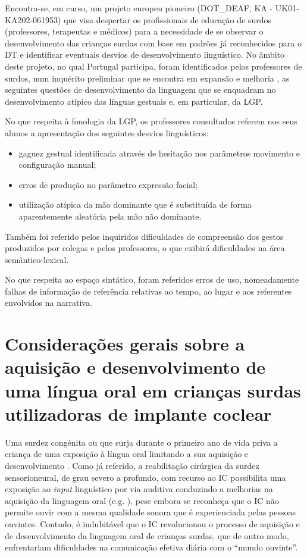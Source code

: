 \documentclass[output=paper,colorlinks,citecolor=brown,booklanguage=portuguese]{langscibook}
\begin{document}
Encontra-se, em curso, um projeto europeu pioneiro (DOT\_DEAF, KA - UK01-KA202-061953) que visa despertar os profissionais de educação de surdos (professores, terapeutas e médicos) para a necessidade de se observar o desenvolvimento das crianças surdas com base em padrões já reconhecidos para o DT e identificar eventuais desvios de desenvolvimento linguístico. No âmbito deste projeto, no qual Portugal participa, foram identificados pelos professores de surdos, num inquérito preliminar que se encontra em expansão e melhoria \citep{Mineiroempreparacao}, as seguintes questões de desenvolvimento da linguagem que se enquadram no desenvolvimento atípico das línguas gestuais e, em particular, da LGP. 

No que respeita à fonologia da LGP, os professores consultados referem nos seus alunos a apresentação dos seguintes desvios linguísticos:

\begin{itemize}
    \item gaguez gestual identificada através de hesitação nos parâmetros movimento e configuração manual;
\item	erros de produção no parâmetro expressão facial;
\item	utilização atípica da mão dominante que é substituída de forma aparentemente aleatória pela mão não dominante. 
\end{itemize}
Também foi referido pelos inquiridos dificuldades de compreensão dos gestos produzidos por colegas e pelos professores, o que exibirá dificuldades na área semântico-lexical.

No que respeita ao espaço sintático, foram referidos erros de uso, nomeadamente falhas de informação de referência relativas ao tempo, ao lugar e aos referentes envolvidos na narrativa.

\section{Considerações gerais sobre a aquisição e desenvolvimento de uma língua oral em crianças surdas utilizadoras de implante coclear}
Uma surdez congénita ou que surja durante o primeiro ano de vida priva a criança de uma exposição à língua oral limitando a sua aquisição e desenvolvimento \citep{Hall2019}. Como já referido, a reabilitação cirúrgica da surdez sensorioneural, de grau severo a profundo, com recurso ao IC possibilita uma exposição ao \emph{input} linguístico por via auditiva conduzindo a melhorias na aquisição da linguagem oral (e.g. \citealp{Tavakoli2015}), pese embora se reconheça que o IC não permite ouvir com a mesma qualidade sonora que é experienciada pelas pessoas ouvintes. Contudo, é indubitável que o IC revolucionou o processo de aquisição e de desenvolvimento da linguagem oral de crianças surdas, que de outro modo, enfrentariam dificuldades na comunicação efetiva diária com o “mundo ouvinte”. 
\end{document}
